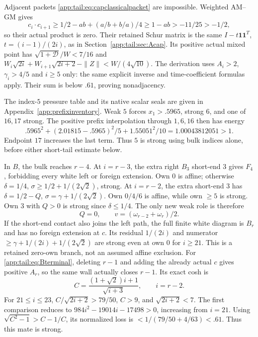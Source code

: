 \documentclass[11pt]{article}
\theoremstyle{definition}
\theoremstyle{remark}
\begin{document}
Adjacent packets \eqref{app:tail:eq:capclassicalpacket} are impossible.
Weighted AM--GM gives
\[
 c_i\cdot c_{i+1}\ge1/2-ab+(a/b+b/a)/4
             \ge1-ab>-11/25>-1/2,
\]
so their actual product is zero. Their retained Schur matrix is the
same $I-t\mathbf1\mathbf1^T$, $t=(i-1)/(2i)$, as in
Section~\ref{app:tail:sec:Acap}. Its positive actual mixed point has
$\sqrt{1+\mathcal D}/W<7/16$ and
$W_i\sqrt{2i}+W_{i+1}\sqrt{2i+2}-\|Z\|<W/(4\sqrt{10})$.
The derivation uses $A_i>2$, $\gamma_i>4/5$ and $i\ge5$ only:
the same explicit inverse and time-coefficient formulas apply.
Their sum is below $.61$, proving nonadjacency.

The index-$5$ pressure table and its native scalar seals are given
in Appendix~\ref{app:prefixinventory}. Weak $5$ forces $x_1>.5965$, strong
$6$, and one of $16,17$ strong. The positive prefix interpolation
through $1,6,16$ then has energy
\begin{equation}\label{app:tail:eq:capbootstrap}
 .5965^2+(2.01815-.5965)^2/5+1.55051^2/10
       =1.00043812051>1.
\end{equation}
Endpoint $17$ increases the last term. Thus $5$ is strong using
bulk indices alone, before either short-tail estimate below.

In $B$, the bulk reaches $r-4$. At $i=r-3$, the extra right $B_3$
short-end $3$ gives $F_4$, forbidding every white left or foreign
extension. Own $0$ is affine; otherwise
$\delta=1/4$, $\sigma\ge1/2+1/(2\sqrt2)$, strong.
At $i=r-2$, the extra short-end $3$ has
$\delta=1/2-Q$, $\sigma=\gamma+1/(2\sqrt2)$.
Own $0/4/6$ is affine, while own $\ge5$ is strong.
Own $3$ with $Q>0$ is strong since $\delta\le1/4$.
The only new weak role is therefore
\begin{equation}\label{app:tail:eq:Bterminal}
 Q=0,\qquad v=(\omega_{r-2}+\omega_r)/2.
\end{equation}
If the short-end contact also joins the left path, the full finite
white diagram is $B_r$ and has no foreign extension at $c$.
Its residual $1/(2i)$ and numerator
$\ge\gamma+1/(2i)+1/(2\sqrt2)$ are strong even at own $0$
for $i\ge21$. This is a retained zero-own branch, not an assumed
affine exclusion.
For \eqref{app:tail:eq:Bterminal}, deleting $r-1$ and adding the already
actual $c$ gives positive $A_r$, so the same wall actually closes
$r-1$. Its exact cosh is
\[
 C=\frac{(1+\sqrt2)i+1}{\sqrt{i+3}},\qquad i=r-2.
\]
For $21\le i\le23$, $C/\sqrt{2i+2}>79/50$, $C>9$, and
$\sqrt{2i+2}<7$. The first comparison reduces to
$984i^2-19014i-17498>0$, increasing from $i=21$.
Using $\sqrt{C^2-1}>C-1/C$, its normalized loss is
$<1/(79/50+4/63)<.61$. Thus this mate is strong.
\end{document}
